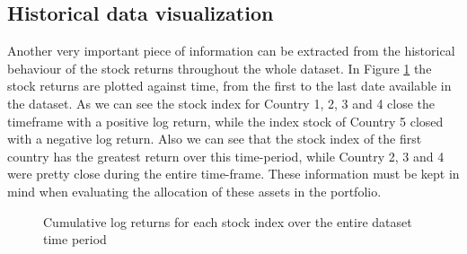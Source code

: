 \subsection{Historical data visualization}
Another very important piece of information can be extracted from the historical behaviour of the stock returns throughout the whole dataset. In Figure \ref{fig:cum-log-returns} the stock returns are plotted against time, from the first to the last date available in the dataset. As we can see the stock index for Country 1, 2, 3 and 4 close the timeframe with a positive log return, while the index stock of Country 5 closed with a negative log return. Also we can see that the stock index of the first country has the greatest return over this time-period, while Country 2, 3 and 4 were pretty close during the entire time-frame. These information must be kept in mind when evaluating the allocation of these assets in the portfolio. 

\begin{figure}[htb]
\centering

\caption{Cumulative log returns for each stock index over the entire dataset time period}
\label{fig:cum-log-returns}
\end{figure}